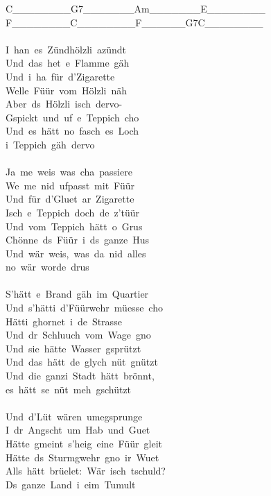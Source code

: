 \documentclass[]{book}
\begin{document}
\textbar C\_\_\_\_\_\_\_\_\textbar G7\_\_\_\_\_\_\_\textbar Am\_\_\_\_\_\_\_\textbar E\_\_\_\_\_\_\_\_\textbar{}\\
\textbar F\_\_\_\_\_\_\_\_\textbar C\_\_\_\_\_\_\_\_\textbar F\_\_\_\_\_\_G7\textbar C\_\_\_\_\_\_\_\_\textbar{}\\
~\\
I~han~es~Zündhölzli~azündt\\
Und~das~het~e~Flamme~gäh\\
Und~i~ha~für~d'Zigarette\\
Welle~Füür~vom~Hölzli~näh\\
Aber~ds~Hölzli~isch~dervo-\\
Gspickt~und~uf~e~Teppich~cho\\
Und~es~hätt~no~fasch~es~Loch~\\
i~Teppich~gäh~dervo\\
~\\
Ja~me~weis~was~cha~passiere\\
We~me~nid~ufpasst~mit~Füür\\
Und~für~d'Gluet~ar~Zigarette\\
Isch~e~Teppich~doch~de~z'tüür\\
Und~vom~Teppich~hätt~o~Grus\\
Chönne~ds~Füür~i~ds~ganze~Hus\\
Und~wär~weis,~was~da~nid~alles~\\
no~wär~worde~drus\\
~\\
S'hätt~e~Brand~gäh~im~Quartier\\
Und~s'hätti~d'Füürwehr~müesse~cho\\
Hätti~ghornet~i~de~Strasse\\
Und~dr~Schluuch~vom~Wage~gno\\
Und~sie~hätte~Wasser~gsprützt\\
Und~das~hätt~de~glych~nüt~gnützt\\
Und~die~ganzi~Stadt~hätt~brönnt,~\\
es~hätt~se~nüt~meh~gschützt\\
~\\
Und~d'Lüt~wären~umegsprunge\\
I~dr~Angscht~um~Hab~und~Guet\\
Hätte~gmeint~s'heig~eine~Füür~gleit\\
Hätte~ds~Sturmgwehr~gno~ir~Wuet\\
Alls~hätt~brüelet:~Wär~isch~tschuld?\\
Ds~ganze~Land~i~eim~Tumult\\
\end{document}
